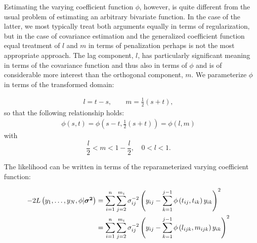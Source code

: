 \documentclass[12pt]{article}
\newcommand{\vsigmasq}{\mbox{\boldmath $\sigma^2$}}
\theoremstyle{definition}
\begin{document}
Estimating the varying coefficient function $\phi$, however, is quite different from the usual problem of estimating an arbitrary bivariate function. In the case of the latter, we most typically treat both arguments equally in terms of regularization, but in the case of covariance estimation and the generalized coefficient function equal treatment of $l$ and $m$ in terms of penalization perhaps is not the most appropriate approach. The lag component, $l$, has particularly significant meaning in terms of the covariance function and thus also in terms of $\phi$ and is of considerable more interest than the orthogonal component, $m$. We parameterize $\phi$ in terms of the transformed domain:

\begin{align*}
l = t-s, \qquad m = \frac{1}{2}\left(s+t\right),
\end{align*}
\noindent
so that the following relationship holds:
\begin{align*}
\phi\left(s,t\right) = \phi\left(s-t, \frac{1}{2}\left(s+t\right)\right) =\phi\left(l,m\right)
\end{align*}
with 
\begin{equation} \label{eq:phi-star-domain}
\frac{l}{2} < m < 1 - \frac{l}{2}, \quad 0 < l < 1.
\end{equation}

\noindent
The likelihood can be written in terms of the reparameterized varying coefficient function:

\begin{align} 
\begin{split} \label{loglikelihood}
-2L\left(y_1,\dots,y_N ,\phi \vert \vsigmasq \right) &= \sum_{i=1}^n \sum_{j=2}^{m_i} \sigma_{ij}^{-2} \left(y_{ij} - \sum_{k=1}^{j-1}\phi\left({t_{ij},t_{ik}}\right)y_{ik} \right)^2 \\
&= \sum_{i=1}^n \sum_{j=2}^{m_i} \sigma_{ij}^{-2} \left(y_{ij} - \sum_{k=1}^{j-1}\phi\left({l_{ijk},m_{ijk}}\right)y_{ik} \right)^2 
\end{split} 
\end{align}
\end{document}
